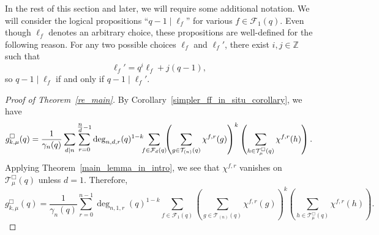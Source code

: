 \documentclass[Unicode,ALCO]{cedram}
\newcommand{\CF}{\mathcal{F}}
\newcommand{\CT}{\mathcal{T}}
\newcommand{\Z}{\mathbb{Z}}
\begin{document}
In the rest of this section and later, we will require some additional notation.
We will consider the logical propositions ``\(q-1 \mid \ell_f\)'' for various \(f \in \CF_1 (q)\).
Even though \(\ell_f\) denotes an arbitrary choice, these propositions are well-defined for the following reason.
For any two possible choices \(\ell_f\) and \(\ell_f'\), there exist \(i,j \in \Z\) such that
\begin{equation}
\ell_f' = q^i \ell_f + j(q-1),
\end{equation}
so \(q-1 \mid \ell_f\) if and only if \(q-1 \mid \ell_f'\).







\begin{proof}[Proof of Theorem~\ref{re_main}]
By Corollary~\ref{simpler_ff_in_situ_corollary}, we have
\[
g_{k,\mu}^\Box (q)
=
\frac{1}{\gamma_n(q)}
\sum_{d \mid n}
\sum_{r = 0}^{\tfrac{n}{d} - 1}
\deg_{n,d,r}(q)^{1-k}
\hspace{-0.15cm} \sum_{f \in \CF_d (q)}
\hspace{-0.15cm}  \left (
\sum_{g \in \CT_{(n)} (q)} \chi^{f,r} (g)
\right )^k
\left (
\sum_{h \in \CT^\Box_\mu (q)} \chi^{f,r} (h)
\right ).
\]
Applying Theorem~\ref{main_lemma_in_intro}, we see that \(\chi^{f,r}\) vanishes on \(\CT_\mu^\Box (q)\) unless \(d = 1\).
Therefore,
\begin{equation}
\label{nepenthe}
g_{k,\mu}^\Box (q)
=
\frac{1}{\gamma_n(q)}
\sum_{r = 0}^{n - 1}
\deg_{n,1,r}(q)^{1-k}
\sum_{f \in \CF_1 (q)}
\left (
\sum_{g \in \CT_{(n)} (q)} \chi^{f,r} (g)
\right )^k
\left (
\sum_{h \in \CT_\mu^\Box (q)} \chi^{f,r} (h)
\right ).
\end{equation}


\end{proof}
\end{document}
